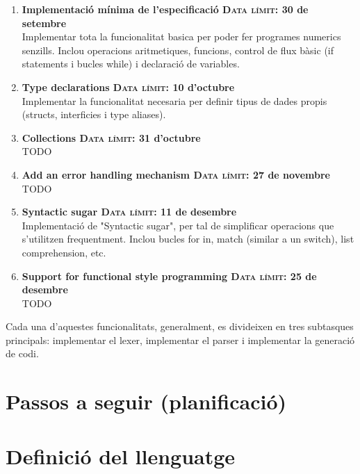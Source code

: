 ﻿\documentclass{article}
\begin{document}
\begin{enumerate}
    \item \textbf{Implementació mínima de l'especificació \null\hfill \textsc{Data límit:} 30 de setembre}\\
        Implementar tota la funcionalitat basica per poder fer programes 
        numerics senzills. Inclou operacions aritmetiques, funcions, control de 
        flux bàsic (if statements i bucles while) i declaració de variables.

    \item \textbf{Type declarations \null\hfill \textsc{Data límit:} 10 d'octubre}\\
        Implementar la funcionalitat necesaria per definir tipus de dades 
        propis (structs, interficies i type aliases).

    \item \textbf{Collections \null\hfill \textsc{Data límit:} 31 d'octubre}\\
        TODO
    
    \item \textbf{Add an error handling mechanism \null\hfill \textsc{Data límit:} 27 de novembre}\\
        TODO
    
    \item \textbf{Syntactic sugar \null\hfill \textsc{Data límit:} 11 de desembre}\\
        Implementació de "Syntactic sugar", per tal de simplificar operacions 
        que s'utilitzen frequentment. Inclou bucles for in, match (similar a un
        switch), list comprehension, etc.
    
    \item \textbf{Support for functional style programming \null\hfill \textsc{Data límit:} 25 de desembre}\\
        TODO
\end{enumerate}

Cada una d'aquestes funcionalitats, generalment, es divideixen en tres 
subtasques principals: implementar el lexer, implementar el parser i 
implementar la generació de codi.

\section{Passos a seguir (planificació)}

\section{Definició del llenguatge}
\end{document}
